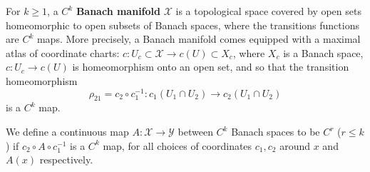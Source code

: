 \begin{defn}
  For $k\ge 1$, a $C^{k}$ \textbf{Banach manifold} $\mathscr{X}$ is a topological space covered by open sets homeomorphic to open subsets of Banach spaces, where the transitions functions are $C^{k}$ maps. More precisely, a Banach manifold comes equipped with a maximal atlas of coordinate charts: $c:U_{c}\subset \mathscr{X}\to c(U)\subset X_{c}$, where $X_{c}$ is a Banach space, $c:U_{c}\to c(U)$ is homeomorphism onto an open set, and so that the transition homeomorphism
  \begin{equation*}
    \rho_{21}=c_{2}\circ c_{1}^{-1}:c_{1}(U_{1}\cap U_{2})\to c_{2}(U_{1}\cap U_{2})
  \end{equation*}
  is a $C^{k}$ map.

  We define a continuous map $A:\mathscr{X}\to \mathscr{Y}$ between $C^{k}$ Banach spaces to be $C^{r}$ ($r\le k$) if $c_{2}\circ A\circ c_{1}^{-1}$ is a $C^{k}$ map, for all choices of coordinates $c_{1},c_{2}$ around $x$ and $A(x)$ respectively. 
\end{defn}
